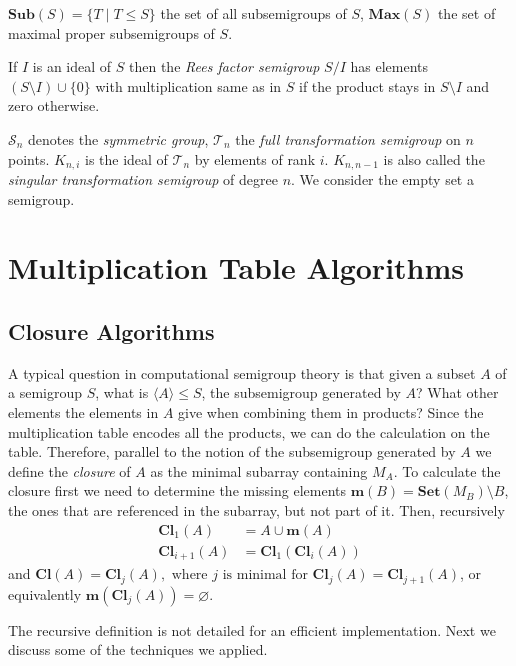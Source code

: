 \documentclass{amsart}
\newcommand{\cT}{{\mathcal T}}
\newcommand{\cS}{{\mathcal S}}
\newcommand{\Sub}{\mathbf{Sub}}
\newcommand{\Set}{\mathbf{Set}}
\newcommand{\Miss}{\mathbf{m}}
\newcommand{\Closure}{\mathbf{Cl}}
\newcommand{\Max}{\mathbf{Max}}
\theoremstyle{plain}
\theoremstyle{definition}
\begin{document}
$\Sub(S)=\big\{T\mid T\leq S \big\}$ the set of all subsemigroups of $S$, $\Max(S)$ the set of maximal proper subsemigroups of $S$.

If $I$ is an ideal of $S$ then the \emph{Rees factor semigroup} $S/I$ has elements $(S\setminus I)\cup\{0\}$ with multiplication same as in $S$ if the product stays in $S\setminus I$ and zero otherwise.

$\cS_n$ denotes the \emph{symmetric group}, $\cT_n$ the \emph{full transformation semigroup} on $n$ points.
$K_{n,i}$ is the ideal of $\cT_n$ by elements of rank $i$.
$K_{n,n-1}$ is also called the \emph{singular transformation semigroup} of degree $n$.
We consider the empty set a semigroup.

\section{Multiplication Table Algorithms}
\label{sec:multab}

\subsection{Closure Algorithms}
A typical question in computational semigroup theory is that given a subset $A$ of a semigroup $S$, what is $\langle A\rangle\leq S$,  the subsemigroup generated by $A$?
What other elements the elements in $A$ give when combining them in products?
Since the multiplication table encodes all the products, we can do the calculation on the table. 
Therefore, parallel to the notion of the subsemigroup generated by $A$ we define the \emph{closure} of $A$ as the minimal subarray containing $M_A$.
To calculate the closure first we need to determine the missing elements $\Miss(B)=\Set(M_B)\setminus B$, the ones that are referenced in the subarray, but not part of it.
Then, recursively
\begin{align*}
\Closure_1(A)&=A\cup\Miss(A)\\
\Closure_{i+1}(A)&=\Closure_1(\Closure_{i}(A))
\end{align*}
and
$ \Closure(A)=\Closure_j(A), \text{ where $j$ is minimal for }\Closure_j(A)=\Closure_{j+1}(A)$, or equivalently $\Miss(\Closure_j(A))=\varnothing$.

The recursive definition is not detailed for an efficient implementation. Next we discuss some of the techniques we applied.
\end{document}
